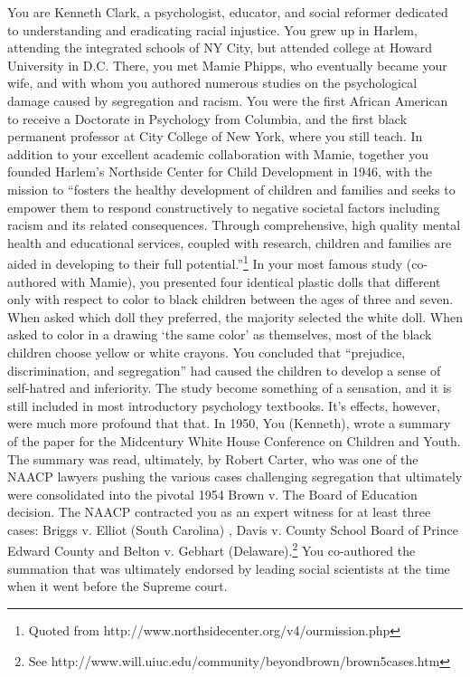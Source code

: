 You are Kenneth Clark, a psychologist, educator, and social reformer dedicated to understanding and eradicating racial injustice. You grew up in Harlem, attending the integrated schools of NY City, but attended college at Howard University in D.C. There, you met Mamie Phipps, who eventually became your wife, and with whom you authored numerous studies on the psychological damage caused by segregation and racism. You were the first African American to receive a Doctorate in Psychology from Columbia, and the first black permanent professor at City College of New York, where you still teach.
In addition to your excellent academic collaboration with Mamie, together you founded Harlem's Northside Center for Child Development in 1946, with the mission to “fosters the healthy development of children and families and seeks to empower them to respond constructively to negative societal factors including racism and its related consequences. Through comprehensive, high quality mental health and educational services, coupled with research, children and families are aided in developing to their full potential.”\footnote{Quoted from http:\slash \slash www.northsidecenter.org\slash v4\slash ourmission.php}
In your most famous study (co-authored with Mamie), you presented four identical plastic dolls that different only with respect to color to black children between the ages of three and seven. When asked which doll they preferred, the majority selected the white doll. When asked to color in a drawing `the same color' as themselves, most of the black children choose yellow or white crayons. You concluded that “prejudice, discrimination, and segregation” had caused the children to develop a sense of self-hatred and inferiority.
The study become something of a sensation, and it is still included in most introductory psychology textbooks. It's effects, however, were much more profound that that.
In 1950, You (Kenneth), wrote a summary of the paper for the Midcentury White House Conference on Children and Youth. The summary was read, ultimately, by Robert Carter, who was one of the NAACP lawyers pushing the various cases challenging segregation that ultimately were consolidated into the pivotal 1954 Brown v. The Board of Education decision. The NAACP contracted you as an expert witness for at least three cases: Briggs v. Elliot (South Carolina) , Davis v. County School Board of Prince Edward County and Belton v. Gebhart (Delaware).\footnote{See http:\slash \slash www.will.uiuc.edu\slash community\slash beyondbrown\slash brown5cases.htm} You co-authored the summation that was ultimately endorsed by leading social scientists at the time when it went before the Supreme court.

